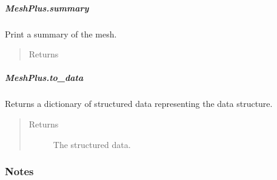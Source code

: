 \documentclass[letterpaper,10pt,english]{sphinxmanual}
\begin{document}
\begin{fulllineitems}
\begin{fulllineitems}
\end{fulllineitems}



\subparagraph{MeshPlus.summary}
\label{\detokenize{api/generated/directional_clustering.mesh.MeshPlus.summary:meshplus-summary}}\label{\detokenize{api/generated/directional_clustering.mesh.MeshPlus.summary::doc}}

\begin{fulllineitems}
\label{\detokenize{api/generated/directional_clustering.mesh.MeshPlus.summary:directional_clustering.mesh.MeshPlus.summary}}
Print a summary of the mesh.
\begin{quote}\begin{description}
\item[{Returns}] \leavevmode
{}

\end{description}\end{quote}

\end{fulllineitems}



\subparagraph{MeshPlus.to\_data}
\label{\detokenize{api/generated/directional_clustering.mesh.MeshPlus.to_data:meshplus-to-data}}\label{\detokenize{api/generated/directional_clustering.mesh.MeshPlus.to_data::doc}}

\begin{fulllineitems}
\label{\detokenize{api/generated/directional_clustering.mesh.MeshPlus.to_data:directional_clustering.mesh.MeshPlus.to_data}}
Returns a dictionary of structured data representing the data structure.
\begin{quote}\begin{description}
\item[{Returns}] \leavevmode
{} \textendash{} The structured data.

\end{description}\end{quote}
\subsubsection*{Notes}


\end{fulllineitems}
\end{fulllineitems}
\end{document}
